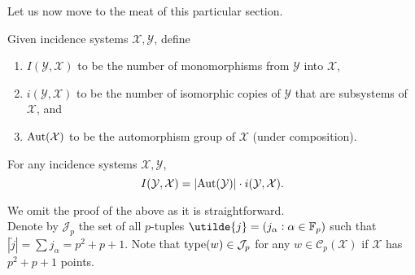 	Let us now move to the meat of this particular section.

	\begin{definition}
		Given incidence systems $\mathcal{X},\mathcal{Y}$, define
		\begin{enumerate}
			\item $I(\mathcal{Y},\mathcal{X})$ to be the number of monomorphisms from $\mathcal{Y}$ into $\mathcal{X}$,
			\item $i(\mathcal{Y},\mathcal{X})$ to be the number of isomorphic copies of $\mathcal{Y}$ that are subsystems of $\mathcal{X}$, and
			\item $\operatorname{Aut}(\mathcal{X})$ to be the automorphism group of $\mathcal{X}$ (under composition).
		\end{enumerate}
	\end{definition}

	\begin{lemma}
		\label{lemma: I i relation}
		For any incidence systems $\mathcal{X},\mathcal{Y}$,
		\[ I(\mathcal{Y},\mathcal{X}) = |{\operatorname{Aut}}(\mathcal{Y})| \cdot i(\mathcal{Y},\mathcal{X}). \]
	\end{lemma}
	We omit the proof of the above as it is straightforward.\\

	Denote by $\mathcal{J}_p$ the set of all $p$-tuples $\utilde{j} = (j_\alpha : \alpha \in \F_p)$ such that $|\utilde{j}| = \sum j_\alpha = p^2 + p + 1$. Note that $\operatorname{type}(w) \in \mathcal{J}_p$ for any $w \in \mathcal{C}_p(\mathcal{X})$ if $\mathcal{X}$ has $p^2+p+1$ points.

